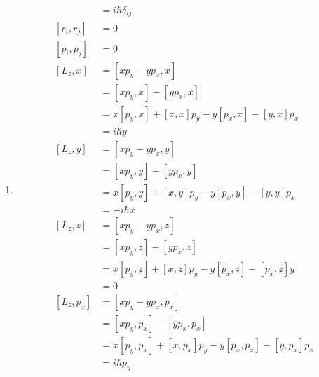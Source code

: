 \documentclass{article}
\begin{document}
\begin{enumerate}
  \item

        \begin{align*}
          [r_i, p_j] & = i \hbar \delta_{i j}                                      \\
          [r_i, r_j] & = 0                                                         \\
          [p_i, p_j] & = 0                                                         \\
          [L_z, x]   & = [x p_y - y p_x, x]                                        \\
                     & = [x p_y, x] - [y p_x, x]                                   \\
                     & = x [p_y, x] + [x, x] p_y - y [p_x, x] - [y, x] p_x         \\
                     & = i \hbar y                                                 \\
          [L_z, y]   & = [x p_y - y p_x, y]                                        \\
                     & = [x p_y, y] - [y p_x, y]                                   \\
                     & = x [p_y, y] + [x, y] p_y - y [p_x, y] - [y, y] p_x         \\
                     & = -i \hbar x                                                \\
          [L_z, z]   & = [x p_y - y p_x, z]                                        \\
                     & = [x p_y, z] - [y p_x, z]                                   \\
                     & = x [p_y, z] + [x, z] p_y - y [p_x, z] - [p_x, z] y         \\
                     & = 0                                                         \\
          [L_z, p_x] & = [x p_y - y p_x, p_x]                                      \\
                     & = [x p_y, p_x] - [y p_x, p_x]                               \\
                     & = x [p_y, p_x] + [x, p_x] p_y - y [p_x, p_x] - [y, p_x] p_x \\
                     & = i \hbar p_y                                               \\

\end{align*}
\end{enumerate}
\end{document}
